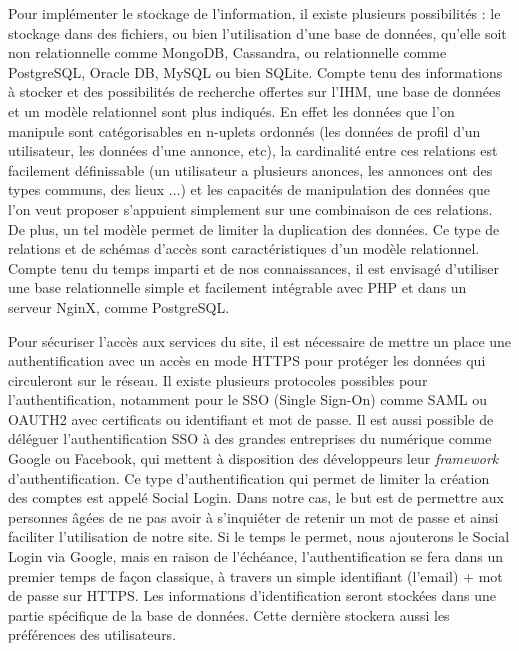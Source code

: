 \documentclass[a4paper,11pt]{article}
\begin{document}
Pour implémenter le stockage de l’information, il existe plusieurs possibilités : le stockage dans des
fichiers, ou bien l’utilisation d'une base de données, qu’elle soit non relationnelle comme MongoDB,
Cassandra, ou relationnelle comme PostgreSQL, Oracle DB, MySQL ou bien SQLite. Compte tenu des
informations à stocker et des possibilités de recherche offertes sur l’IHM, une base de données et un
modèle relationnel sont plus indiqués. En effet les données que l'on manipule sont catégorisables
en n-uplets ordonnés (les données de profil d'un utilisateur, les données d'une annonce, etc), la
cardinalité entre ces relations est facilement définissable (un utilisateur a plusieurs anonces, les
annonces ont des types communs, des lieux ...) et les capacités de manipulation des données que l'on
veut proposer s'appuient simplement sur une combinaison de ces relations. De plus, un tel modèle permet de
limiter la duplication des données. Ce type de relations et de schémas d'accès sont caractéristiques
d'un modèle relationnel. Compte tenu du temps imparti et de nos connaissances,
il est envisagé d’utiliser une base relationnelle simple et facilement intégrable avec PHP et
dans un serveur NginX, comme PostgreSQL.\\
\pagebreak

Pour sécuriser l’accès aux services du site, il est nécessaire de mettre un place une authentification
avec un accès en mode HTTPS pour protéger les données qui circuleront sur le réseau. Il existe
plusieurs protocoles possibles pour l’authentification, notamment pour le SSO (Single Sign-On) comme SAML ou
OAUTH2 avec certificats ou identifiant et mot de passe. Il est aussi possible de déléguer l'authentification
SSO à des grandes entreprises du numérique comme Google ou Facebook, qui mettent à disposition des développeurs leur \textit{framework} d'authentification.
Ce type d'authentification qui permet de limiter la création des comptes est appelé Social Login.
Dans notre cas, le but est de permettre aux personnes âgées de ne pas avoir à s’inquiéter de retenir un mot
de passe et ainsi faciliter l’utilisation de notre site. Si le temps le permet, nous ajouterons le Social Login
via Google, mais en raison de l’échéance, l’authentification se fera dans un premier temps de façon classique, à
travers un simple identifiant (l'email) + mot de passe sur HTTPS. Les informations d’identification seront stockées
dans une partie spécifique de la base de données. Cette dernière stockera aussi les préférences des utilisateurs. \\
\end{document}
